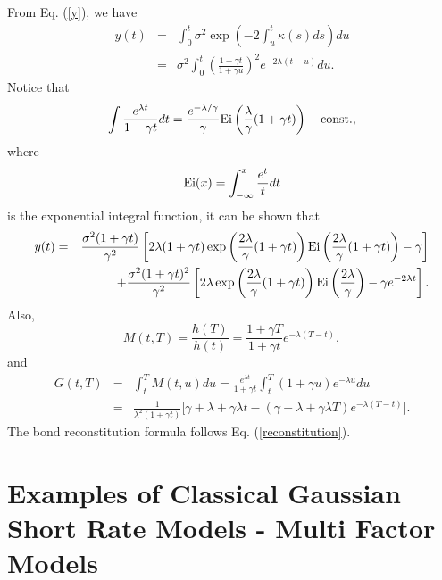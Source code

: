 \documentclass[12pt]{article}
\begin{document}
  From Eq. (\ref{y}), we have
  \begin{eqnarray}
    y(t) &=& \int_0^t\sigma^2\exp\left(-2\int_u^t\kappa(s)ds\right)du\nonumber\\
         &=& \sigma^2\int_0^t\left(\frac{1+\gamma t}{1+\gamma u}\right)^2e^{-2\lambda(t-u)}du.
  \end{eqnarray}
  Notice that
  \begin{equation}
    \int \frac{e^{\lambda t}}{1+\gamma t}dt = \frac{e^{-\lambda/\gamma}}{\gamma}{\rm Ei}\left(\frac{\lambda}{\gamma}(1+\gamma t)\right) + {\rm const.},
  \end{equation}
  where
  \begin{equation}
    {\rm Ei}(x)=\int_{-\infty}^x\frac{e^t}{t}dt
  \end{equation}
  is the exponential integral function, it can be shown that
  \begin{eqnarray}
    y(t) &=& \frac{\sigma^2(1+\gamma t)}{\gamma^2}\left[2\lambda(1+\gamma t)\exp\left(\frac{2\lambda}{\gamma}(1+\gamma t)\right)
                      {\rm Ei}\left(\frac{2\lambda}{\gamma}(1+\gamma t)\right)-\gamma\right]\nonumber\\
         && \quad +\frac{\sigma^2(1+\gamma t)^2}{\gamma^2}\left[2\lambda\exp\left(\frac{2\lambda}{\gamma}(1+\gamma t)\right)
                      {\rm Ei}\left(\frac{2\lambda}{\gamma}\right)-\gamma e^{-2\lambda t}\right].
  \end{eqnarray}
  Also,
  \begin{equation}
    M(t,T)=\frac{h(T)}{h(t)}=\frac{1+\gamma T}{1+\gamma t}e^{-\lambda(T-t)},
  \end{equation}
  and
  \begin{eqnarray}
    G(t,T)&=&\int_t^TM(t,u)du=\frac{e^{\lambda t}}{1+\gamma t}\int_t^T(1+\gamma u)e^{-\lambda u}du\nonumber\\
          &=&\frac{1}{\lambda^2(1+\gamma t)}\Big[\gamma+\lambda+\gamma\lambda t - \left(\gamma+\lambda+\gamma\lambda T\right)e^{-\lambda(T-t)}\Big].
  \end{eqnarray}
  The bond reconstitution formula follows Eq. (\ref{reconstitution}).


\section{Examples of Classical Gaussian Short Rate Models - Multi Factor Models}
\end{document}
